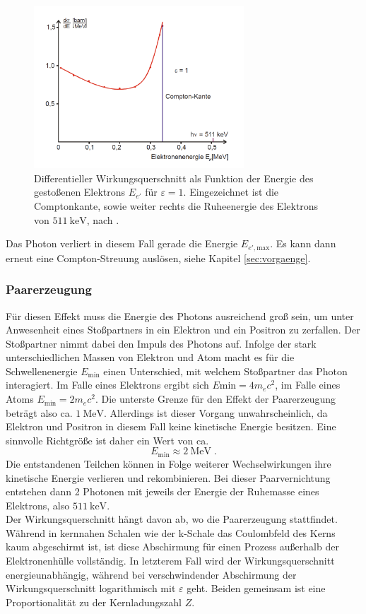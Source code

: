  \begin{figure}
   \centering
   \includegraphics[width=0.7\textwidth]{ressources/compton2.png}
   \caption{Differentieller Wirkungsquerschnitt als Funktion der Energie des gestoßenen Elektrons $E_{e'}$ für $\varepsilon=1$. Eingezeichnet ist die Comptonkante, sowie weiter rechts die Ruheenergie des Elektrons von $\SI{511}{\kilo\electronvolt}$, nach \cite{skript}.}
   \label{fig:comptonWQ}
 \end{figure}
 Das Photon verliert in diesem Fall gerade die Energie $E_{e',\text{max}}$. Es kann dann erneut eine Compton-Streuung auslösen, siehe Kapitel \ref{sec:vorgaenge}.

 \subsubsection{Paarerzeugung}
Für diesen Effekt muss die Energie des Photons ausreichend groß sein, um unter Anwesenheit eines Stoßpartners in ein Elektron und ein Positron zu zerfallen. Der Stoßpartner nimmt dabei den Impuls des Photons auf. Infolge der stark unterschiedlichen Massen von Elektron und Atom macht es für die Schwellenenergie $E_\text{min}$ einen Unterschied, mit welchem Stoßpartner das Photon interagiert. Im Falle eines Elektrons ergibt sich $E\text{min}=4m_e c^2$, im Falle eines Atoms $E_\text{min}=2m_e c^2$. Die unterste Grenze für den Effekt der Paarerzeugung beträgt also ca. $\SI{1}{\mega\electronvolt}$. Allerdings ist dieser Vorgang unwahrscheinlich, da Elektron und Positron in diesem Fall keine kinetische Energie besitzen. Eine sinnvolle Richtgröße ist daher ein Wert von ca.
\begin{equation}
  E_\text{min}\approx\SI{2}{\mega\electronvolt} \; .
\end{equation}
Die entstandenen Teilchen können in Folge weiterer Wechselwirkungen ihre kinetische Energie verlieren und rekombinieren. Bei dieser Paarvernichtung entstehen dann 2 Photonen mit jeweils der Energie der Ruhemasse eines Elektrons, also $\SI{511}{\kilo\electronvolt}$.\\
Der Wirkungsquerschnitt hängt davon ab, wo die Paarerzeugung stattfindet. Während in kernnahen Schalen wie der k-Schale das Coulombfeld des Kerns kaum abgeschirmt ist, ist diese Abschirmung für einen Prozess außerhalb der Elektronenhülle vollständig. In letzterem Fall wird der Wirkungsquerschnitt energieunabhängig, während bei verschwindender Abschirmung der Wirkungsquerschnitt logarithmisch mit $\varepsilon$ geht. Beiden gemeinsam ist eine Proportionalität zu der Kernladungszahl $Z$.

